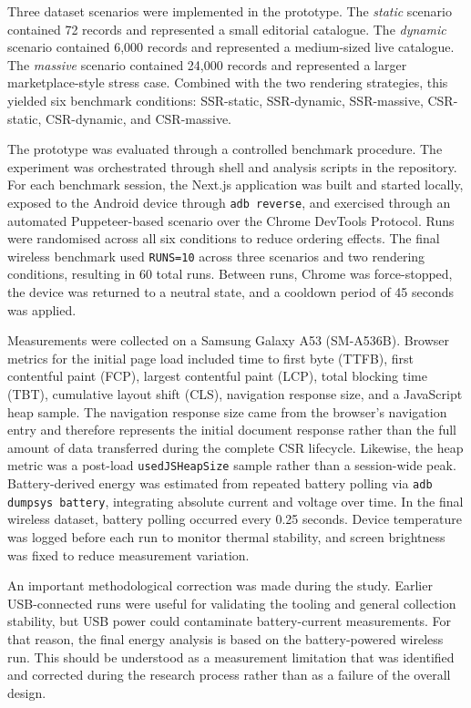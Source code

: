 Three dataset scenarios were implemented in the prototype. The \textit{static} scenario contained 72 records and represented a small editorial catalogue. The \textit{dynamic} scenario contained 6{,}000 records and represented a medium-sized live catalogue. The \textit{massive} scenario contained 24{,}000 records and represented a larger marketplace-style stress case. Combined with the two rendering strategies, this yielded six benchmark conditions: SSR-static, SSR-dynamic, SSR-massive, CSR-static, CSR-dynamic, and CSR-massive.

The prototype was evaluated through a controlled benchmark procedure. The experiment was orchestrated through shell and analysis scripts in the repository. For each benchmark session, the Next.js application was built and started locally, exposed to the Android device through \texttt{adb reverse}, and exercised through an automated Puppeteer-based scenario over the Chrome DevTools Protocol. Runs were randomised across all six conditions to reduce ordering effects. The final wireless benchmark used \texttt{RUNS=10} across three scenarios and two rendering conditions, resulting in 60 total runs. Between runs, Chrome was force-stopped, the device was returned to a neutral state, and a cooldown period of 45 seconds was applied.

Measurements were collected on a Samsung Galaxy A53 (SM-A536B). Browser metrics for the initial page load included time to first byte (TTFB), first contentful paint (FCP), largest contentful paint (LCP), total blocking time (TBT), cumulative layout shift (CLS), navigation response size, and a JavaScript heap sample. The navigation response size came from the browser's navigation entry and therefore represents the initial document response rather than the full amount of data transferred during the complete CSR lifecycle. Likewise, the heap metric was a post-load \texttt{usedJSHeapSize} sample rather than a session-wide peak. Battery-derived energy was estimated from repeated battery polling via \texttt{adb dumpsys battery}, integrating absolute current and voltage over time. In the final wireless dataset, battery polling occurred every 0.25 seconds. Device temperature was logged before each run to monitor thermal stability, and screen brightness was fixed to reduce measurement variation.

An important methodological correction was made during the study. Earlier USB-connected runs were useful for validating the tooling and general collection stability, but USB power could contaminate battery-current measurements. For that reason, the final energy analysis is based on the battery-powered wireless run. This should be understood as a measurement limitation that was identified and corrected during the research process rather than as a failure of the overall design.

